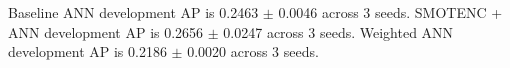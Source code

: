 Baseline ANN development AP is 0.2463 $\pm$ 0.0046 across 3 seeds. SMOTENC + ANN development AP is 0.2656 $\pm$ 0.0247 across 3 seeds. Weighted ANN development AP is 0.2186 $\pm$ 0.0020 across 3 seeds.
